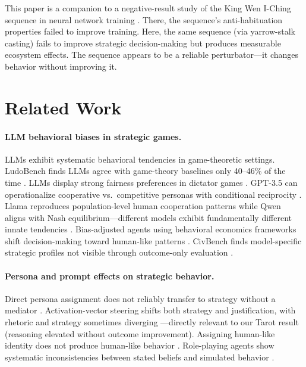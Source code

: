 \documentclass[11pt]{article}
\begin{document}
This paper is a companion to a negative-result study of the King Wen I-Ching sequence in neural network training \citep{Chan2026kingwen}. There, the sequence's anti-habituation properties failed to improve training. Here, the same sequence (via yarrow-stalk casting) fails to improve strategic decision-making but produces measurable ecosystem effects. The sequence appears to be a reliable perturbator---it changes behavior without improving it.


\section{Related Work}
\label{sec:related}

\paragraph{LLM behavioral biases in strategic games.}
LLMs exhibit systematic behavioral tendencies in game-theoretic settings. LudoBench finds LLMs agree with game-theory baselines only 40--46\% of the time \citep{Jain2026ludobench}. LLMs display strong fairness preferences in dictator games \citep{Einwiller2025dictator}. GPT-3.5 can operationalize cooperative vs.\ competitive personas with conditional reciprocity \citep{Phelps2023psychology}. Llama reproduces population-level human cooperation patterns while Qwen aligns with Nash equilibrium---different models exhibit fundamentally different innate tendencies \citep{CeraPalatsi2025cooperation}. Bias-adjusted agents using behavioral economics frameworks shift decision-making toward human-like patterns \citep{Kitadai2025bias}. CivBench finds model-specific strategic profiles not visible through outcome-only evaluation \citep{Chen2026civbench}.

\paragraph{Persona and prompt effects on strategic behavior.}
Direct persona assignment does not reliably transfer to strategy without a mediator \citep{Licato2025persona}. Activation-vector steering shifts both strategy and justification, with rhetoric and strategy sometimes diverging \citep{Sun2026persona}---directly relevant to our Tarot result (reasoning elevated without outcome improvement). Assigning human-like identity does not produce human-like behavior \citep{Ma2024behavioral}. Role-playing agents show systematic inconsistencies between stated beliefs and simulated behavior \citep{Mannekote2025roleplaying}.
\end{document}
